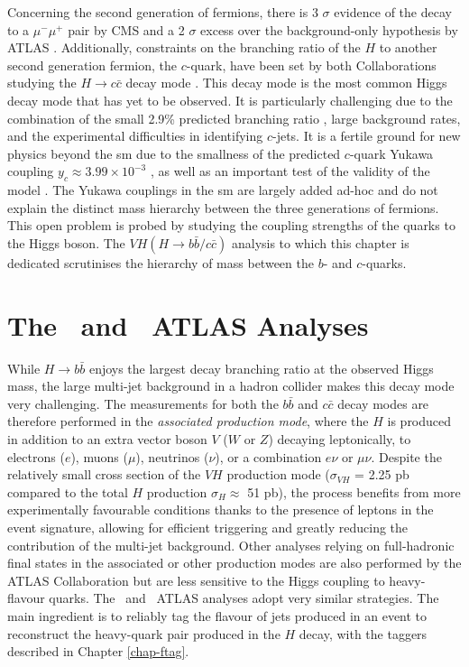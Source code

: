 Concerning the second generation of fermions, there is 3 $\sigma$ evidence of the decay to a $\mu^-\mu^+$ pair by CMS \cite{CMS:2020xwi} and a 2 $\sigma$ excess over the background-only hypothesis by ATLAS \cite{ATLAS:2020fzp}. Additionally, constraints on the branching ratio of the $H$ to another second generation fermion, the $c$-quark, have been set by both Collaborations studying the $H \rightarrow c\bar{c}$ decay mode \cite{Aaboud:2018fhh}. This decay mode is the most common Higgs decay mode that has yet to be observed. It is particularly challenging due to the combination of the small 2.9\% predicted branching ratio \cite{DJOUADI199856}, large background rates, and the experimental difficulties in identifying $c$-jets. It is a fertile ground for new physics beyond the \gls{sm} due to the smallness of the predicted $c$-quark Yukawa coupling $y_c \approx 3.99 \times 10^{-3} $ \cite{yukawac}, as well as an important test of the validity of the model \cite{PhysRevD.89.033014,PhysRevD.92.033016,Botella:2016krk,PhysRevD.98.055001,GHOSH2016504,PhysRevLett.123.031802,PhysRevD.100.115041}. The Yukawa couplings in the \gls{sm} are largely added ad-hoc and do not explain the distinct mass hierarchy between the three generations of fermions. This open problem is probed by studying the coupling strengths of the quarks to the Higgs boson. The $VH (H \rightarrow b\bar{b}/c\bar{c})$ analysis to which this chapter is dedicated scrutinises the hierarchy of mass between the $b$- and $c$-quarks.

\section[The \vhb\ and \vhc\ ATLAS Analyses]{The \boldvhb\ and \boldvhc\ ATLAS Analyses}
While $H \rightarrow b\bar{b}$ enjoys the largest decay branching ratio at the observed Higgs mass, the large multi-jet background in a hadron collider makes this decay mode very challenging. The measurements for both the $b\bar{b}$ and $c\bar{c}$ decay modes are therefore performed in the \textit{associated production mode}, where the $H$ is produced in addition to an extra vector boson $V$ ($W$ or $Z$) decaying leptonically, to electrons ($e$), muons ($\mu$), neutrinos ($\nu$), or a combination $e\nu$ or $\mu\nu$. Despite the relatively small cross section of the $VH$ production mode ($\sigma_{VH}$ = 2.25 pb compared to the total $H$ production $\sigma_H \approx$ 51 pb), the process benefits from more experimentally favourable conditions thanks to the presence of leptons in the event signature, allowing for efficient triggering and greatly reducing the contribution of the multi-jet background. Other analyses relying on full-hadronic final states in the associated or other production modes are also performed by the ATLAS Collaboration but are less sensitive to the Higgs coupling to heavy-flavour quarks. The \vhb\ and \vhc\ ATLAS analyses adopt very similar strategies. The main ingredient is to reliably tag the flavour of jets produced in an event to reconstruct the heavy-quark pair produced in the $H$ decay, with the taggers described in Chapter \ref{chap-ftag}. \\ 

